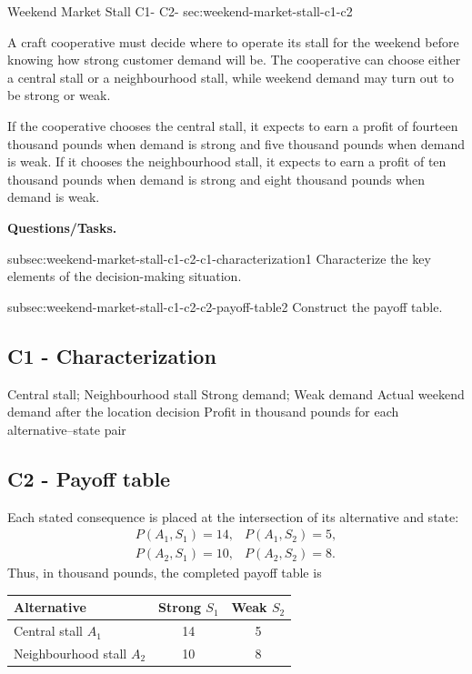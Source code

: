 	\sectionScored
	{Weekend Market Stall}
	{C1- \hspace{2mm} C2-}
	{sec:weekend-market-stall-c1-c2}
	{
	A craft cooperative must decide where to operate its stall for the weekend before knowing how strong customer demand will be. The cooperative can choose either a central stall or a neighbourhood stall, while weekend demand may turn out to be strong or weak.

	If the cooperative chooses the central stall, it expects to earn a profit of fourteen thousand pounds when demand is strong and five thousand pounds when demand is weak. If it chooses the neighbourhood stall, it expects to earn a profit of ten thousand pounds when demand is strong and eight thousand pounds when demand is weak.

	\textbf{Questions/Tasks.}
	\begin{enumerate}
		\CriterionTask
		{subsec:weekend-market-stall-c1-c2-c1-characterization}{1}
		{Characterize the key elements of the decision-making situation. }

		\CriterionTask
		{subsec:weekend-market-stall-c1-c2-c2-payoff-table}{2}
		{Construct the payoff table. }
	\end{enumerate}

	\label{subsec:weekend-market-stall-c1-c2-c1-characterization}
	\subsection*{C1 - Characterization }
	
	\DecisionElementsTable
		{Central stall; Neighbourhood stall}
		{Strong demand; Weak demand}
		{Actual weekend demand after the location decision}
		{Profit in thousand pounds for each alternative--state pair}
	
	\label{subsec:weekend-market-stall-c1-c2-c2-payoff-table}
	\subsection*{C2 - Payoff table }
	
	Each stated consequence is placed at the intersection of its alternative and state:
	\[
	\begin{array}{ll}
	P(A_1,S_1)=14, & P(A_1,S_2)=5,\\
	P(A_2,S_1)=10, & P(A_2,S_2)=8.
	\end{array}
	\]
	Thus, in thousand pounds, the completed payoff table is
	\begin{center}
	\begin{tabular}{lcc}
	\toprule
	Alternative & Strong \(S_1\) & Weak \(S_2\)\\
	\midrule
	Central stall \(A_1\) & 14 & 5\\
	Neighbourhood stall \(A_2\) & 10 & 8\\
	\bottomrule
	\end{tabular}
	\end{center}


	\vspace{-5mm}

	}

